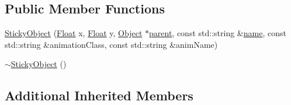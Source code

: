 \subsection*{Public Member Functions}
\begin{DoxyCompactItemize}
\item 
\hyperlink{classZeta_1_1StickyObject_a379ad6051030fd7787db911283dce49d}{Sticky\+Object} (\hyperlink{namespaceZeta_a1e0a1265f9b3bd3075fb0fabd39088ba}{Float} x, \hyperlink{namespaceZeta_a1e0a1265f9b3bd3075fb0fabd39088ba}{Float} y, \hyperlink{classZeta_1_1Object}{Object} $\ast$\hyperlink{classZeta_1_1ChildObject_aca8fcd19fdb0291c58a21cd91046e4aa}{parent}, const std\+::string \&\hyperlink{classZeta_1_1Object_ace4ef81b7c300e0a170292e9888cd66f}{name}, const std\+::string \&animation\+Class, const std\+::string \&anim\+Name)
\item 
\hyperlink{classZeta_1_1StickyObject_ab2028985b88fc6fe4d3a41e7e2926e6c}{$\sim$\+Sticky\+Object} ()
\end{DoxyCompactItemize}
\subsection*{Additional Inherited Members}



